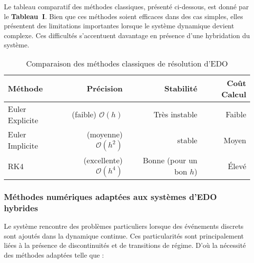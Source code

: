 \documentclass[12pt, oneside]{report} %
\theoremstyle{definition}
\theoremstyle{remark}
\begin{document}
Le tableau comparatif des méthodes classiques, présenté ci-dessous, est donné par le \textbf{Tableau~I}.  
Bien que ces méthodes soient efficaces dans des cas simples, elles présentent des limitations importantes lorsque le système dynamique devient complexe. Ces difficultés s'accentuent davantage en présence d’une hybridation du système.


	\begin{landscape}
	\begin{table}[] 
		\Huge 
		\label{tab:tableau comparatif}
		\centering  
		\caption{Comparaison des méthodes classiques de résolution d'EDO}  
		\begin{tabular}{@{}lrrr@{}}  
			\toprule  
			\textbf{Méthode} & \textbf{Précision} & \textbf{Stabilité} & \textbf{Coût Calcul} \\  
			\hline  
			\midrule
			Euler Explicite &(faible) $\mathcal{O}(h)$ & Très instable & Faible \\  
			Euler Implicite &(moyenne) $\mathcal{O}(h^2)$ & stable & Moyen  \\  
			RK4 &(excellente) $\mathcal{O}(h^4)$ & Bonne (pour un bon $h$) & Élevé\\  
			\bottomrule  
		\end{tabular}  
	\end{table} 
\end{landscape}

\subsubsection{Méthodes numériques adaptées aux systèmes d'EDO hybrides}
Le système rencontre des problèmes particuliers lorsque des événements discrets sont ajoutés dans la dynamique continue. Ces particularités sont principalement liées à la présence de discontinuités et de transitions de régime. D'où la nécessité des méthodes adaptées telle que : 	
\end{document}
